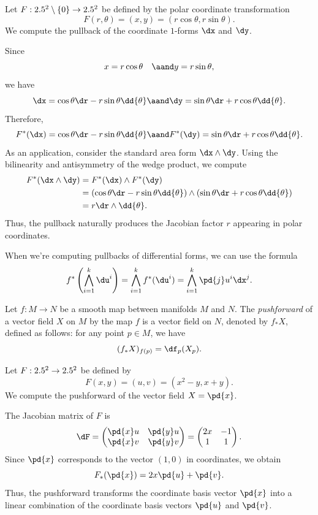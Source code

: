 \begin{example}
  Let $F : 2.5^2 \setminus \{0\} \to 2.5^2$ be defined by the polar coordinate transformation
  \[%
    F(r,\theta) = (x,y) = (r\cos\theta, r\sin\theta)
  .\]%
  We compute the pullback of the coordinate $1$-forms $\dx$ and $\dy$.

  Since
  \[%
    x = r\cos\theta \quad \aand y = r\sin\theta
  ,\]%
  we have
  \[%
    \dx = \cos\theta \dr - r\sin\theta \dd{\theta} \aand \dy = \sin\theta \dr + r\cos\theta \dd{\theta}
  .\]%
  Therefore,
  \[%
    F^*(\dx) = \cos\theta \dr - r\sin\theta \dd{\theta} \aand F^*(\dy) = \sin\theta \dr + r\cos\theta \dd{\theta}
  .\]%
  As an application, consider the standard area form $\dx \wedge \dy$. Using the bilinearity and antisymmetry of the wedge product, we compute
  \begin{align*}
    F^*(\dx \wedge \dy) &= F^*(\dx) \wedge F^*(\dy) \\
                      &= (\cos\theta \dr - r\sin\theta \dd{\theta}) \wedge (\sin\theta \dr + r\cos\theta \dd{\theta}) \\
                      &= r \dr \wedge \dd{\theta}.
  \end{align*}
  Thus, the pullback naturally produces the Jacobian factor $r$ appearing in polar coordinates.
\end{example}

When we're computing pullbacks of differential forms, we can use the formula
\[%
  f^*\left(\bigwedge_{i=1}^k \du^i\right) = \bigwedge_{i=1}^k f^*(\du^i) = \bigwedge_{i=1}^k \pd{j} u^i \dx^j
.\]%

\begin{definition}
  Let $f : M \to N$ be a smooth map between manifolds $M$ and $N$. The \emph{pushforward} of a vector field $X$ on $M$ by the map $f$ is a vector field on $N$, denoted by $f_*X$, defined as follows: for any point $p \in M$, we have
  \[%
    (f_*X)_{f(p)} = \df_p(X_p)
  .\]%
\end{definition}

\begin{example}
  Let $F : 2.5^2 \to 2.5^2$ be defined by
  \[%
    F(x,y) = (u,v) = (x^2 - y, x + y)
  .\]%
  We compute the pushforward of the vector field $X = \pd{x}$.

  The Jacobian matrix of $F$ is
  \[%
    \dF = \begin{pmatrix}
      \pd{x} u & \pd{y} u \\
      \pd{x} v & \pd{y} v \\
    \end{pmatrix}
    = \begin{pmatrix}
      2x & -1 \\
      1 & 1 \\
    \end{pmatrix}
  .\]%
  Since $\pd{x}$ corresponds to the vector $(1,0)$ in coordinates, we obtain
  \[%
    F_*(\pd{x}) = 2x \pd{u} + \pd{v}
  .\]%
  Thus, the pushforward transforms the coordinate basis vector $\pd{x}$ into a linear combination of the coordinate basis vectors $\pd{u}$ and $\pd{v}$.
\end{example}

